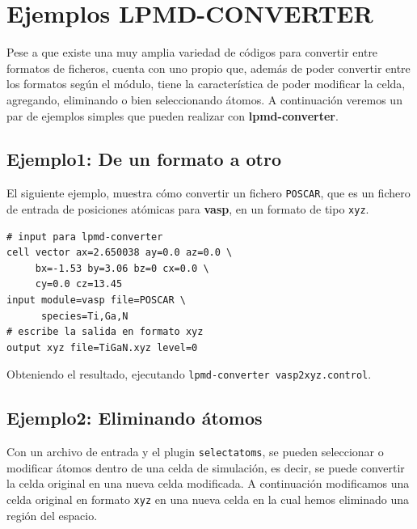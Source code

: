 \section{Ejemplos LPMD-CONVERTER}

Pese a que existe una muy amplia variedad de c\'odigos para convertir entre formatos de ficheros, {\lpmd} cuenta con uno propio que, adem\'as de poder convertir entre los formatos seg\'un el m\'odulo, tiene la caracter\'istica de poder modificar la celda, agregando, eliminando o bien seleccionando \'atomos. A continuaci\'on veremos un par de ejemplos simples que pueden realizar con \textbf{lpmd-converter}.

\subsection{Ejemplo1: De un formato a otro}

El siguiente ejemplo, muestra c\'omo convertir un fichero \verb|POSCAR|, que es un fichero de entrada de posiciones at\'omicas para \textbf{vasp}, en un formato de tipo \verb|xyz|.

\begin{multicols}{2}
\setlength{\columnseprule}{.5pt}
\begin{verbatim}
# input para lpmd-converter
cell vector ax=2.650038 ay=0.0 az=0.0 \
     bx=-1.53 by=3.06 bz=0 cx=0.0 \
     cy=0.0 cz=13.45
input module=vasp file=POSCAR \
      species=Ti,Ga,N
# escribe la salida en formato xyz
output xyz file=TiGaN.xyz level=0
\end{verbatim}
\end{multicols}

Obteniendo el resultado, ejecutando \verb|lpmd-converter vasp2xyz.control|.
% 

\subsection{Ejemplo2: Eliminando \'atomos}

Con un archivo de entrada y el plugin \verb|selectatoms|, se pueden seleccionar o modificar \'atomos dentro de una celda de simulaci\'on, es decir, se puede convertir la celda original en una nueva celda modificada. A continuaci\'on modificamos una celda original en formato \verb|xyz| en una nueva celda en la cual hemos eliminado una regi\'on del espacio.

